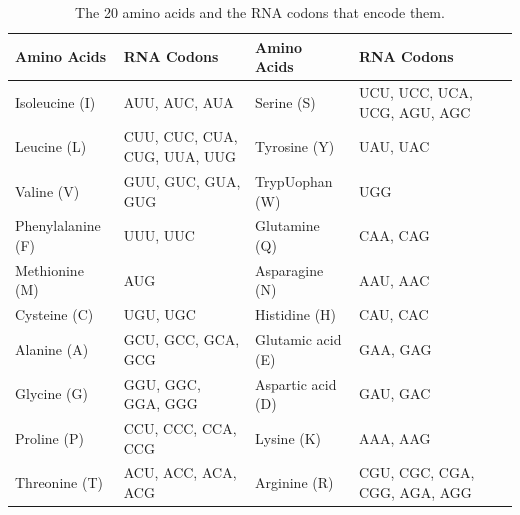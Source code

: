 \begin{table}
\small
\centering
\begin{tabular}{|l|p{3cm}|l|p{3cm}|l|l|}
\hline
\textbf{Amino Acids} & \textbf{RNA Codons}          & \textbf{Amino Acids} & \textbf{RNA Codons}          \\ \hline
Isoleucine (I)       & AUU, AUC, AUA                & Serine (S)           & UCU, UCC, UCA, UCG, AGU, AGC \\ \hline
Leucine (L)          & CUU, CUC, CUA, CUG, UUA, UUG & Tyrosine (Y)         & UAU, UAC                     \\ \hline
Valine (V)           & GUU, GUC, GUA, GUG           & TrypUophan (W)       & UGG                          \\ \hline
Phenylalanine (F)    & UUU, UUC                     & Glutamine (Q)        & CAA, CAG                     \\ \hline
Methionine (M)       & AUG                          & Asparagine (N)       & AAU, AAC                     \\ \hline
Cysteine (C)         & UGU, UGC                     & Histidine (H)        & CAU, CAC                     \\ \hline
Alanine (A)          & GCU, GCC, GCA, GCG           & Glutamic acid (E)    & GAA, GAG                     \\ \hline
Glycine (G)          & GGU, GGC, GGA, GGG           & Aspartic acid (D)    & GAU, GAC                     \\ \hline
Proline (P)          & CCU, CCC, CCA, CCG           & Lysine (K)           & AAA, AAG                     \\ \hline
Threonine (T)        & ACU, ACC, ACA, ACG           & Arginine (R)         & CGU, CGC, CGA, CGG, AGA, AGG \\ \hline
\end{tabular}
\caption{The 20 amino acids and the RNA codons that encode them.\label{tab:amino-acid}}
\label{my-label}
\end{table}

